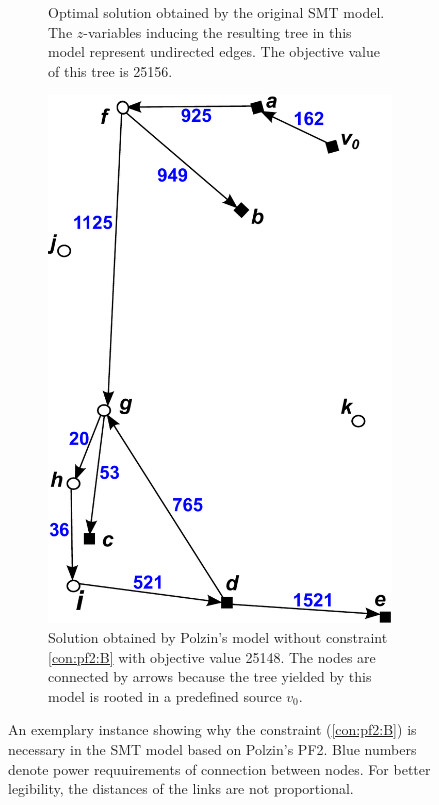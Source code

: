 \begin{figure}[!htb]
\begin{subfigure}[b]{0.4\textwidth}
        \caption{Optimal solution obtained by the original SMT model. The $z$-variables inducing the resulting tree in this model represent undirected edges. The objective value of this tree is 25156.}
        \label{fig:BorigSMT}
    \end{subfigure}
    \hfill %
    \begin{subfigure}[b]{0.4\textwidth}
        \includegraphics[width=\textwidth]{conBNec2}
        \caption{Solution obtained by Polzin's model without constraint \ref{con:pf2:B} with objective value 25148. The nodes are connected by arrows because the tree yielded by this model is rooted in a predefined source $v_0$.}
        \label{fig:Bpf2}
    \end{subfigure}
    \caption{An exemplary instance showing why the constraint (\ref{con:pf2:B}) is necessary in the SMT model based on Polzin's PF2. Blue numbers denote power requuirements of connection between nodes. For better legibility, the distances of the links are not proportional.} \label{fig:BProof}
\end{figure}   
